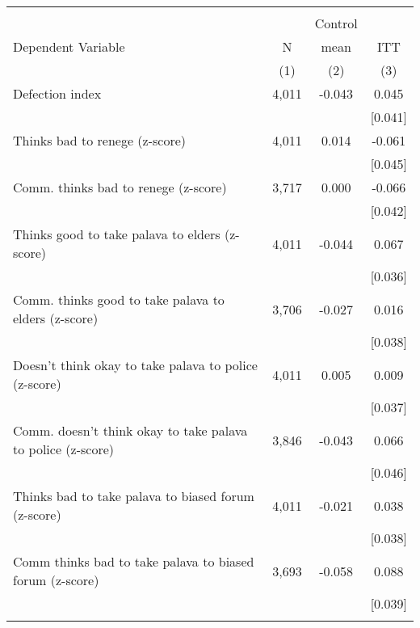 \begin{tabular}{lccc}
\hline \noalign{\smallskip} &  &  & \\
 &  & Control & \\
Dependent Variable & N & mean & ITT\\
 & (1) & (2) & (3)\\
\noalign{\smallskip}\hline \noalign{\smallskip}Defection index & 4,011 & -0.043 & 0.045\\
 &  &  & [0.041]\\
\quad Thinks bad to renege (z-score) & 4,011 & 0.014 & -0.061\\
 &  &  & [0.045]\\
\quad Comm. thinks bad to renege (z-score) & 3,717 & 0.000 & -0.066\\
 &  &  & [0.042]\\
\quad Thinks good to take palava to elders (z-score) & 4,011 & -0.044 & 0.067\\
 &  &  & [0.036]\\
\quad Comm. thinks good to take palava to elders (z-score) & 3,706 & -0.027 & 0.016\\
 &  &  & [0.038]\\
\quad Doesn't think okay to take palava to police (z-score) & 4,011 & 0.005 & 0.009\\
 &  &  & [0.037]\\
\quad Comm. doesn't think okay to take palava to police (z-score) & 3,846 & -0.043 & 0.066\\
 &  &  & [0.046]\\
\quad Thinks bad to take palava to biased forum (z-score) & 4,011 & -0.021 & 0.038\\
 &  &  & [0.038]\\
\quad Comm thinks bad to take palava to biased forum (z-score) & 3,693 & -0.058 & 0.088\\
 &  &  & [0.039]\\
\noalign{\smallskip}\hline\end{tabular}
